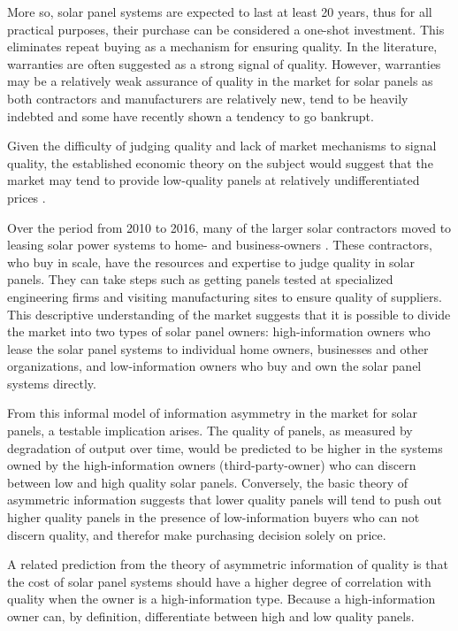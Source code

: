 \documentclass[a4paper]{article}
\begin{document}
More so, solar panel systems are expected to last at least 20 years, thus for all practical purposes, their purchase can be considered a one-shot investment. This eliminates repeat buying as a mechanism for ensuring quality. In the literature, warranties are often suggested as a strong signal of quality. However, warranties may be a relatively weak assurance of quality in the market for solar panels as both contractors and manufacturers are relatively new, tend to be heavily indebted and some have recently shown a tendency to go bankrupt.

Given the difficulty of judging quality and lack of market mechanisms to signal quality, the established economic theory on the subject would suggest that the market may tend to provide low-quality panels at relatively undifferentiated prices \citep{tirole_theory_1988}.

Over the period from 2010 to 2016, many of the larger solar contractors moved to leasing solar power systems to home- and business-owners \citep{mauritzen_cost_2017}. These contractors, who buy in scale, have the resources and expertise to judge quality in solar panels. They can take steps such as getting panels tested at specialized engineering firms and visiting manufacturing sites to ensure quality of suppliers. This descriptive understanding of the market suggests that it is possible to divide the market into two types of solar panel owners: high-information owners who lease the solar panel systems to individual home owners, businesses and other organizations, and low-information owners who buy and own the solar panel systems directly.

From this informal model of information asymmetry in the market for solar panels, a testable implication arises. The quality of panels, as measured by degradation of output over time, would be predicted to be higher in the systems owned by the high-information owners (third-party-owner) who can discern between low and high quality solar panels. Conversely, the basic theory of asymmetric information suggests that lower quality panels will tend to push out higher quality panels in the presence of low-information buyers who can not discern quality, and therefor make purchasing decision solely on price.

A related prediction from the theory of asymmetric information of quality is that the cost of solar panel systems should have a higher degree of correlation with quality when the owner is a high-information type. Because a high-information owner can, by definition, differentiate between high and low quality panels.
\end{document}
